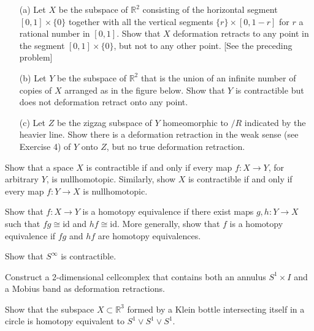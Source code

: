 \documentclass[12pt]{article}
\newcommand{\R}{\mathbb{R}}
\begin{document}
\begin{statement}[0.6]
  \begin{itemize}
    \item[(a)] Let $X$ be the subspace of $\R^2$ consisting of the horizontal segment $[0,1] \times \{0\}$ 
      together with all the vertical segments $\{r\} \times [0,1-r]$ for $r$ a rational number in 
      $[0,1]$. Show that $X$ deformation retracts to any point in the segment $[0,1] \times \{ 0\}$, but
      not to any other point. [See the preceding problem]
    \item[(b)] Let $Y$ be the subspace of $\R^2$ that is the union of an infinite number of copies of $X$ 
      arranged as in the figure below. Show that $Y$ is contractible but does not deformation retract 
      onto any point. 
    \item[(c)] Let $Z$ be the zigzag subspace of $Y$ homeomorphic to $/R$ indicated by the heavier line. 
      Show there is a deformation retraction in the weak sense (see Exercise 4) of $Y$ onto $Z$, but no true 
      deformation retraction.
  \end{itemize}
\end{statement}

\begin{statement}[0.10]
    Show that a space $X$ is contractible if and only if every map $f:X \to Y$, for arbitrary $Y$, is nullhomotopic. Similarly, show $X$ is contractible if and only if every map $f: Y \to X$ is nullhomotopic.
\end{statement}

\begin{statement}[0.11]
    Show that $f: X \to Y$ is a homotopy equivalence if there exist maps $g,h:Y \to X$ such that $fg \cong \text{id}$ and $hf \cong \text{id}$. More generally, show that $f$ is a homotopy equivalence if $fg$ and $hf$ are homotopy equivalences. 
\end{statement}

\begin{statement}[0.16]
  Show that $S^{\infty}$ is contractible.
\end{statement}

\begin{statement}[0.17]
    Construct a 2-dimensional cellcomplex that contains both an annulus $S^1 \times I$ and a Mobius band as 
    deformation retractions.
\end{statement}

\begin{statement}[0.20]
    Show that the subspace $X \subset \mathbb{R}^3$ formed by a Klein bottle intersecting itself in a circle is homotopy equivalent to $S^1 \vee S^1 \vee S^1$.
\end{statement}
\end{document}
